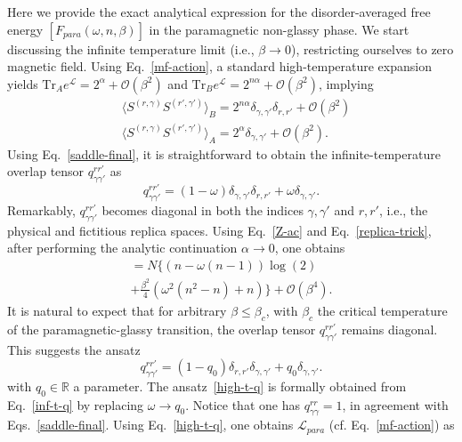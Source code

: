 \documentclass[twocolumn,superscriptaddress,prb,10pt]{revtex4-1}
\def\tr{\textrm{Tr}}
\begin{document}
Here we provide the exact analytical expression for the disorder-averaged free 
energy $[F_{para}(\omega,n,\beta)]$  in the paramagnetic non-glassy phase. 
We start discussing the infinite temperature limit (i.e., $\beta\to 0$), 
restricting ourselves to zero magnetic field. 
Using Eq.~\eqref{mf-action}, a standard high-temperature expansion yields 
$\tr_Ae^{{\mathcal L}}=2^{\alpha}+{\mathcal O}(\beta^2)$ and $\tr_B e^{{
\mathcal L}}=2^{n\alpha}+{\mathcal O}(\beta^2)$, implying  
%
\begin{align}
& \langle S^{(r,\gamma)}S^{(r',\gamma')}\rangle_B=2^{n\alpha}
\delta_{\gamma,\gamma'}\delta_{r,r'}+{\mathcal O}(\beta^2)\\
& \langle S^{(r,\gamma)}S^{(r',\gamma')}\rangle_A=2^{\alpha}
\delta_{\gamma,\gamma'}+{\mathcal O}(\beta^2).
\end{align}
%
Using Eq.~\eqref{saddle-final}, it is straightforward to obtain the 
infinite-temperature overlap tensor $q_{\gamma\gamma'}^{rr'}$ as 
%
\begin{equation}
q_{\gamma\gamma'}^{rr'}=(1-\omega)\delta_{\gamma,\gamma'}\delta_{r,r'}+
\omega\delta_{\gamma,\gamma'}.
\label{inf-t-q}
\end{equation}
%
Remarkably, $q_{\gamma\gamma'}^{rr'}$ becomes diagonal in both the 
indices $\gamma,\gamma'$ and $r,r'$, i.e., the physical and fictitious 
replica spaces. Using Eq.~\eqref{Z-ac} and Eq.~\eqref{replica-trick}, 
after performing the analytic continuation $\alpha\to 0$, one obtains  
%
\begin{multline}
[F_{para}(\omega,n,\beta)]=N\Big\{(n-\omega(n-1))\log(2)\\
+\frac{\beta^2}{4}(\omega^2(n^2-n)+n)\Big\}+
{\mathcal O}(\beta^4).
\label{logZ-ht}
\end{multline}
% 
It is natural to expect that for arbitrary $\beta\le\beta_c$, with 
$\beta_c$ the critical temperature of the paramagnetic-glassy 
transition, the overlap tensor $q_{\gamma\gamma'}^{rr'}$ remains 
diagonal. This suggests the ansatz 
%
\begin{equation}
q_{\gamma\gamma'}^{rr'}=(1-q_0)\delta_{r,r'}\delta_{\gamma,\gamma'}+
q_0\delta_{\gamma,\gamma'}.
\label{high-t-q}
\end{equation}
%
with $q_0\in {\mathbb R}$ a parameter. The ansatz~\eqref{high-t-q} is formally 
obtained from Eq.~\eqref{inf-t-q} by replacing $\omega\to q_0$. Notice that 
one has $q_{\gamma\gamma}^{rr}=1$, in agreement with Eqs.~\eqref{saddle-final}. 
Using Eq.~\eqref{high-t-q}, one obtains ${\mathcal L}_{para}$ (cf. 
Eq.~\eqref{mf-action}) as   
\end{document}
